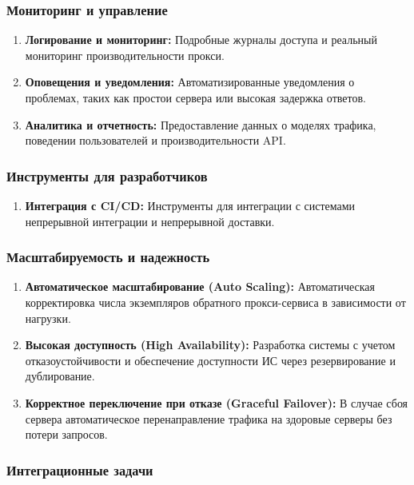 \documentclass[14pt, a4paper]{extarticle}
\begin{document}
\subsubsection*{Мониторинг и управление}

\begin{enumerate}
\item \textbf{Логирование и мониторинг:} Подробные журналы доступа и реальный мониторинг производительности прокси.
\item \textbf{Оповещения и уведомления:} Автоматизированные уведомления о проблемах, таких как простои сервера или высокая задержка ответов.
\item \textbf{Аналитика и отчетность:} Предоставление данных о моделях трафика, поведении пользователей и производительности API.
\end{enumerate}

\subsubsection*{Инструменты для разработчиков}

\begin{enumerate}
\item \textbf{Интеграция с CI/CD:} Инструменты для интеграции с системами непрерывной интеграции и непрерывной доставки.
\end{enumerate}

\subsubsection*{Масштабируемость и надежность}

\begin{enumerate}
\item \textbf{Автоматическое масштабирование (Auto Scaling):} Автоматическая корректировка числа экземпляров обратного прокси-сервиса в зависимости от нагрузки.
\item \textbf{Высокая доступность (High Availability):} Разработка системы с учетом отказоустойчивости и обеспечение доступности ИС через резервирование и дублирование.
\item \textbf{Корректное переключение при отказе (Graceful Failover):} В случае сбоя сервера автоматическое перенаправление трафика на здоровые серверы без потери запросов.
\end{enumerate}

\subsubsection*{Интеграционные задачи}
\end{document}
